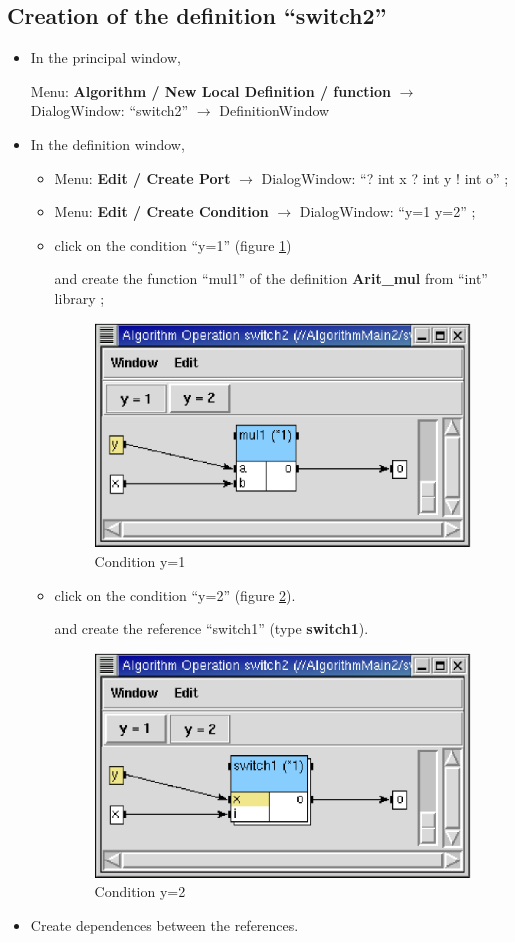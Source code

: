 \documentclass[a4paper,twoside]{report}
\begin{document}
\subsection{Creation of the definition ``switch2''}
\begin{itemize}
\item In the principal window,

Menu: \textbf{Algorithm / New Local Definition / function} $\rightarrow$
DialogWindow: ``switch2'' $\rightarrow$ DefinitionWindow

\item In the definition window, 
\begin{itemize}
\item Menu: \textbf{Edit / Create Port} $\rightarrow$ DialogWindow: ``? int x ?
  int y !  int o'' ;

\item Menu: \textbf{Edit / Create Condition} $\rightarrow$ DialogWindow: ``y=1
y=2'' ;

\item click on the condition ``y=1'' (figure \ref{condition1_algo2}) 

and create the function ``mul1'' of the definition \textbf{Arit\_mul} from
``int'' library ;

\begin{figure}[htbp]
  \begin{center} 
        \includegraphics[width=0.48\linewidth]{Condition1_algo2.eps} 
  \end{center}
  \caption{Condition y=1}
  \label{condition1_algo2}
\end{figure}

\item click on the condition ``y=2'' (figure \ref{condition2_algo2}). 

and create the reference ``switch1'' (type \textbf{switch1}).

\begin{figure}[ht]
  \begin{center} 
        \includegraphics[width=0.48\linewidth]{Condition2_algo2.eps} 
  \end{center}
  \caption{Condition y=2}
  \label{condition2_algo2}
\end{figure}

\end{itemize}

\item Create dependences between the references.
\end{itemize}
\end{document}
